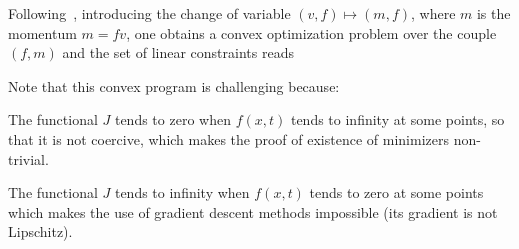 Following~\cite{Benamou2000}, introducing the change of variable $(v,f) \mapsto (m,f)$, where $m$ is the momentum $m = f v$, one obtains a convex optimization problem over the couple $(f,m)$
and the set of linear constraints reads


Note that this convex program is challenging because:
\begin{rs}
	\item The functional $J$ tends to zero when $f(x,t)$ tends to
infinity at some points, so that it is not coercive, which makes the
proof of existence of minimizers non-trivial.
	\item The functional $J$ tends to infinity when $f(x,t)$ tends to
zero at some points which makes the use of gradient descent methods impossible
(its gradient is not Lipschitz). 
\end{rs}
\fi
